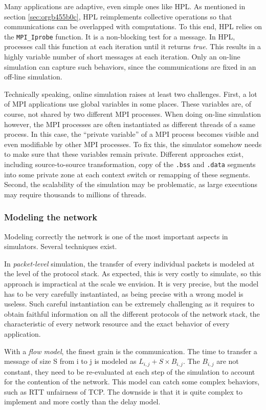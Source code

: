 \documentclass[12pt, a4paper]{memoir}
\begin{document}
Many applications are adaptive, even simple ones like HPL. As mentioned in section \ref{sec:orgb455b0c}, HPL
reimplements collective operations so that communications can be overlapped with computations. To this end, HPL
relies on the \texttt{MPI\_Iprobe} function. It is a non-blocking test for a message. In HPL, processes call this function at
each iteration until it returns \emph{true}. This results in a highly variable number of short messages at each
iteration. Only an on-line simulation can capture such behaviors, since the communications are fixed in an off-line
simulation.

Technically speaking, online simulation raises at least two challenges. First, a lot of MPI applications use global
variables in some places. These variables are, of course, not shared by two different MPI processes. When doing
on-line simulation however, the MPI processes are often instantiated as different threads of a same process. In
this case, the “private variable” of a MPI process becomes visible and even modifiable by other MPI processes. To
fix this, the simulator somehow needs to make sure that these variables remain private. Different approaches exist,
including source-to-source transformation, copy of the \texttt{.bss} and \texttt{.data} segments into some private zone at each
context switch or remapping of these segments. Second, the scalability of the simulation may be problematic, as
large executions may require thousands to millions of threads.
\subsubsection{Modeling the network}
\label{sec:org4b70e40}
Modeling correctly the network is one of the most important aspects in simulators. Several techniques exist.

In \emph{packet-level} simulation, the transfer of every individual packets is modeled at the level of the protocol stack. As expected, this is very
costly to simulate, so this approach is impractical at the scale we envision. It is very precise, but the model has to be very carefully
instantiated, as being precise with a wrong model is useless. Such careful instantiation can be extremely
challenging as it requires to obtain faithful information on all the different protocols of the network stack, the
characteristic of every network resource and the exact behavior of every application.

With a \emph{flow model}, the finest grain is the communication. The time to transfer a message of size S from i to j is
modeled as \(L_{i,j} + S \times B_{i,j}\).  The \(B_{i,j}\) are not constant, they need to be re-evaluated at each step of the
simulation to account for the contention of the network. This model can catch some complex behaviors, such
as RTT unfairness of TCP. The downside is that it is quite complex to implement and more costly than the delay
model.
\end{document}

